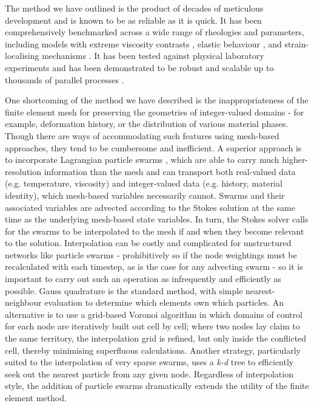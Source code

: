 \documentclass[a4paper,11pt,oneside]{book}
\begin{document}
The method we have outlined is the product of decades of meticulous development and is known to be as reliable as it is quick. It has been comprehensively benchmarked across a wide range of rheologies and parameters, including models with extreme viscosity contrasts \cite{Moresi1996-fn}, elastic behaviour \cite{Moresi2002-pj}, and strain-localising mechanisms \cite{Moresi2007-dg}. It has been tested against physical laboratory experiments \cite{Meriaux2018-tc} and has been demonstrated to be robust and scalable up to thousands of parallel processes \cite{Farrington2005-mo}.

One shortcoming of the method we have described is the inappropriateness of the finite element mesh for preserving the geometries of integer-valued domains - for example, deformation history, or the distribution of various material phases. Though there are ways of accommodating such features using mesh-based approaches, they tend to be cumbersome and inefficient. A superior approach is to incorporate Lagrangian particle swarms \cite{Moresi2003-ip}, which are able to carry much higher-resolution information than the mesh and can transport both real-valued data (e.g. temperature, viscosity) and integer-valued data (e.g. history, material identity), which mesh-based variables necessarily cannot. Swarms and their associated variables are advected according to the Stokes solution at the same time as the underlying mesh-based state variables. In turn, the Stokes solver calls for the swarms to be interpolated to the mesh if and when they become relevant to the solution. Interpolation can be costly and complicated for unstructured networks like particle swarms - prohibitively so if the node weightings must be recalculated with each timestep, as is the case for any advecting swarm - so it is important to carry out such an operation as infrequently and efficiently as possible. Gauss quadrature is the standard method, with simple nearest-neighbour evaluation to determine which elements own which particles. An alternative is to use a grid-based Voronoi algorithm \cite{Velic2009-yd} in which domains of control for each node are iteratively built out cell by cell; where two nodes lay claim to the same territory, the interpolation grid is refined, but only inside the conflicted cell, thereby minimising superfluous calculations. Another strategy, particularly suited to the interpolation of very sparse swarms, uses a \textit{k-d} tree to efficiently seek out the nearest particle from any given node. Regardless of interpolation style, the addition of particle swarms dramatically extends the utility of the finite element method.
\end{document}
